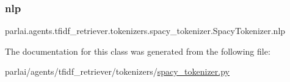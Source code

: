 \subsubsection{\texorpdfstring{nlp}{nlp}}
{\footnotesize\ttfamily parlai.\+agents.\+tfidf\+\_\+retriever.\+tokenizers.\+spacy\+\_\+tokenizer.\+Spacy\+Tokenizer.\+nlp}



The documentation for this class was generated from the following file\+:\begin{DoxyCompactItemize}
\item 
parlai/agents/tfidf\+\_\+retriever/tokenizers/\hyperlink{spacy__tokenizer_8py}{spacy\+\_\+tokenizer.\+py}\end{DoxyCompactItemize}
